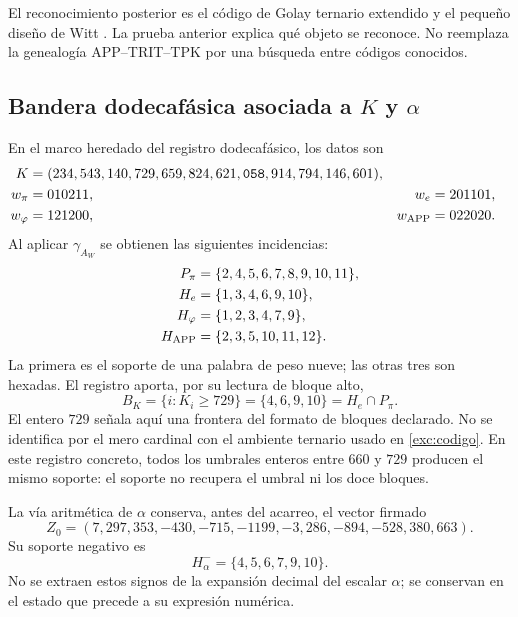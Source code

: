 El reconocimiento posterior es el código de Golay ternario extendido y
el pequeño diseño de Witt \cite{conwaysloane}. La prueba anterior explica qué objeto se
reconoce. No reemplaza la genealogía APP--TRIT--TPK por una búsqueda
entre códigos conocidos.

\subsection{Bandera dodecafásica asociada a \texorpdfstring{$K$ y $\alpha$}{K y alfa}}
\label{exc:bandera}



En el marco heredado del registro dodecafásico, los datos son
\begin{align}
 K={}&(234,543,140,729,659,824,621,\mathtt{058},914,794,146,601),
 \label{exc:k}\\
 w_\pi={}&010211, &w_e={}&201101,\nonumber\\
 w_\varphi={}&121200, &w_{\rm APP}={}&022020.\nonumber
\end{align}
Al aplicar $\gamma_{A_W}$ se obtienen las siguientes incidencias:
\begin{align*}
 P_\pi&=\{2,4,5,6,7,8,9,10,11\},\\
 H_e&=\{1,3,4,6,9,10\},\\
 H_\varphi&=\{1,2,3,4,7,9\},\\
 H_{\rm APP}&=\{2,3,5,10,11,12\}.
\end{align*}
La primera es el soporte de una palabra de peso nueve; las otras tres
son hexadas. El registro aporta, por su lectura de bloque alto,
\begin{equation}
 B_K=\{i:K_i\geq729\}=\{4,6,9,10\}=H_e\cap P_\pi.
 \label{exc:bk}
\end{equation}
El entero $729$ señala aquí una frontera del formato de bloques
declarado. No se identifica por el mero cardinal con el ambiente
ternario usado en \eqref{exc:codigo}. En este registro concreto, todos
los umbrales enteros entre $660$ y $729$ producen el mismo soporte:
el soporte no recupera el umbral ni los doce bloques.

La vía aritmética de $\alpha$ conserva, antes del acarreo, el vector
firmado
\begin{equation}
 Z_0=(7,297,353,-430,-715,-1199,-3,286,-894,-528,380,663).
 \label{exc:precarry}
\end{equation}
Su soporte negativo es
\begin{equation}
 H^-_\alpha=\{4,5,6,7,9,10\}.
 \label{exc:halpha}
\end{equation}
No se extraen estos signos de la expansión decimal del escalar
$\alpha$; se conservan en el estado que precede a su expresión numérica.

